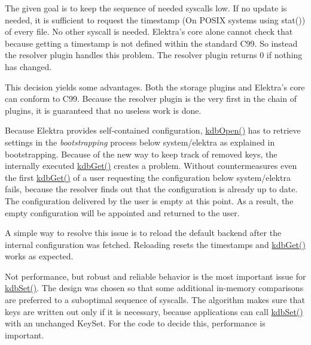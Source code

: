 The given goal is to keep the sequence of needed syscalls low. If no update is needed, it is sufficient to request the timestamp (On P\+O\+S\+IX systems using {\ttfamily stat()}) of every file. No other syscall is needed. Elektra’s core alone cannot check that because getting a timestamp is not defined within the standard C99. So instead the resolver plugin handles this problem. The resolver plugin returns 0 if nothing has changed.

This decision yields some advantages. Both the storage plugins and Elektra’s core can conform to C99. Because the resolver plugin is the very first in the chain of plugins, it is guaranteed that no useless work is done.

Because Elektra provides self-\/contained configuration, {\ttfamily \mbox{\hyperlink{group__kdb_ga6808defe5870f328dd17910aacbdc6ca}{kdb\+Open()}}} has to retrieve settings in the {\itshape bootstrapping} process below {\ttfamily system/elektra} as explained in {\ttfamily bootstrapping}. Because of the new way to keep track of removed keys, the internally executed {\ttfamily \mbox{\hyperlink{group__kdb_ga28e385fd9cb7ccfe0b2f1ed2f62453a1}{kdb\+Get()}}} creates a problem. Without countermeasures even the first {\ttfamily \mbox{\hyperlink{group__kdb_ga28e385fd9cb7ccfe0b2f1ed2f62453a1}{kdb\+Get()}}} of a user requesting the configuration below {\ttfamily system/elektra} fails, because the resolver finds out that the configuration is already up to date. The configuration delivered by the user is empty at this point. As a result, the empty configuration will be appointed and returned to the user.

A simple way to resolve this issue is to reload the default backend after the internal configuration was fetched. Reloading resets the timestamps and {\ttfamily \mbox{\hyperlink{group__kdb_ga28e385fd9cb7ccfe0b2f1ed2f62453a1}{kdb\+Get()}}} works as expected.

Not performance, but robust and reliable behavior is the most important issue for {\ttfamily \mbox{\hyperlink{group__kdb_ga11436b058408f83d303ca5e996832bcf}{kdb\+Set()}}}. The design was chosen so that some additional in-\/memory comparisons are preferred to a suboptimal sequence of {\ttfamily syscalls}. The algorithm makes sure that keys are written out only if it is necessary, because applications can call {\ttfamily \mbox{\hyperlink{group__kdb_ga11436b058408f83d303ca5e996832bcf}{kdb\+Set()}}} with an unchanged {\ttfamily Key\+Set}. For the code to decide this, performance is important.

